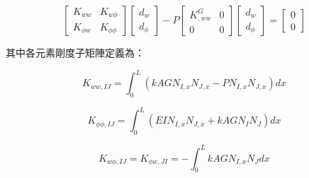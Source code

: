\documentclass[UTF8, a4paper, 12pt]{ctexart}
\begin{document}
\begin{equation}

    \begin{bmatrix}

        K_{ww} & K_{w\phi} \\

        K_{\phi w} & K_{\phi\phi}

    \end{bmatrix}

    \begin{bmatrix}

        d_{w} \\

        d_{\phi}

    \end{bmatrix}

    - P

    \begin{bmatrix}

        K_{,ww}^{G} & 0 \\

        0 & 0

    \end{bmatrix}

    \begin{bmatrix}

        d_{w} \\

        d_{\phi}

    \end{bmatrix} = \begin{bmatrix} 0 \\ 0 \end{bmatrix}

\end{equation}



其中各元素剛度子矩陣定義為：

\begin{equation}

    K_{ww,IJ} = \int_{0}^{L}(kAGN_{I,x}N_{J,x} - PN_{I,x}N_{J,x})dx

\end{equation}

\begin{equation}

    K_{\phi\phi,IJ} = \int_{0}^{L}(EIN_{I,x}N_{J,x} + kAGN_{I}N_{J})dx

\end{equation}

\begin{equation}

    K_{w\phi,IJ} = K_{\phi w,JI} = -\int_{0}^{L}kAGN_{I,x}N_{J}dx

\end{equation}
\end{document}
